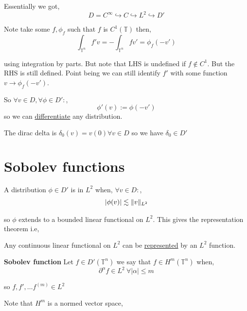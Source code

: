 \vspace{1em}

Essentially we got, 
\[
  D = C^{\infty} \hookrightarrow C \hookrightarrow L^2 \hookrightarrow D'
\]

Note take some $f, \phi_f$ such that $f$ is $C^{1}(\mathbb{T})$ then, 
\[
  \int_{\mathbb{T}^{n}}^{}  f'v  = - \int_{\mathbb{T}^{n}}^{}  f v' = \phi_f (-v')
\]

using integration by parts.  But note that LHS is undefined if $f \not \in C^{1}$. But the RHS is still defined. Point being we can still identify $f'$ with some function $v \to \phi_f (-v')$.

\vspace{1em}

So $\forall v \in D, \forall \phi \in D':$, 
\[
  \phi'(v) := \phi(-v')
\]
so we can \underline{differentiate} any distribution.

\vspace{1em}

The dirac delta is $\delta_0(v) = v(0) \forall v \in D$ so we have $\delta_0 \in D'$


\section{Sobolev functions}
A distribution $\phi \in D'$ is in $L^2$ when, $\forall v \in D:$, 
\[
  |\phi(v) | \lesssim \lVert v\rVert_{L^2}
\]

so $\phi$ extends to a bounded linear functional on $L^2$. This gives the representation theorem i.e, 
\begin{center}
  Any continuous linear functional on $L^2$  can be \underline{represented} by an $L^2$ function.
\end{center}

\textbf{Sobolev function}
Let $f \in D'(\mathbb{T}^{n})$ we say that $f \in H^{m}(\mathbb{T}^{n})$ when, 
\[
  \partial^{\alpha} f \in L^2 \ \forall |\alpha| \le m
\]

so $f, f', \dots  f^{(m)} \in L^2$

\vspace{1em}

Note that $H^{m}$ is a normed vector space,
